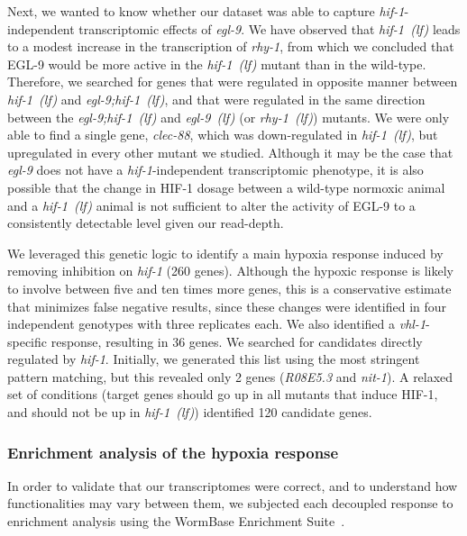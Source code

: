 \documentclass[9pt,twocolumn,twoside]{pnas-new}
\newcommand{\gene}[1]{\emph{#1}}
\newcommand{\egl}{\emph{egl-9~(lf)}}
\newcommand{\rhy}{\emph{rhy-1~(lf)}}
\newcommand{\eglhif}{\emph{egl-9;hif-1~(lf)}}
\newcommand{\hif}{\emph{hif-1~(lf)}}
\newcommand{\eglp}{EGL-9}
\newcommand{\hifp}{HIF-1}
\newcommand{\vhltargets}{36}
\newcommand{\hiftargets}{120}
\begin{document}
Next, we wanted to know whether our dataset was able to capture
\gene{hif-1}-independent transcriptomic effects of  \gene{egl-9}. We have observed
that \hif{} leads to a modest increase in the transcription of \gene{rhy-1},
from which we concluded that \eglp{} would be more active in the \hif{} mutant
than in the wild-type. Therefore, we searched for genes that were regulated in
opposite manner between \hif{} and \eglhif{}, and that were regulated
in the same direction between the \eglhif{} and \egl{} (or \rhy{}) mutants.
We were only able to find a single gene, \emph{clec-88}, which was down-regulated
in \hif{}, but upregulated in every other mutant we studied. Although
it may be the case that \gene{egl-9} does not have a \gene{hif-1}-independent transcriptomic
phenotype, it is also possible that the change in \hifp{} dosage between a
wild-type normoxic animal and a \hif{} animal is not sufficient to alter the
activity of \eglp{} to a consistently detectable level given our read-depth.

We leveraged this genetic logic to identify a main hypoxia
response induced by removing inhibition on \gene{hif-1} (260 genes). Although the
hypoxic response is likely to involve between five and ten times more genes,
this is a conservative estimate that minimizes false negative results, since
these changes were identified in four independent genotypes with three replicates
each. We also identified a \gene{vhl-1}-specific response, resulting in \vhltargets{}
genes. We searched for candidates directly regulated by \gene{hif-1}.
Initially, we generated this list using the most stringent pattern
matching, but this revealed only 2 genes (\emph{R08E5.3} and
\emph{nit-1}). A relaxed set of conditions (target genes should go up in all
mutants that induce \hifp{}, and should not be up in \hif{}) identified
\hiftargets{} candidate genes.

\subsubsection*{Enrichment analysis of the hypoxia response}
\label{sub:ea_hypoxia}
In order to validate that our transcriptomes were correct, and to understand how
functionalities may vary between them, we subjected each decoupled response to
enrichment analysis using the WormBase Enrichment
Suite~\cite{Angeles-Albores2016}.
\end{document}
